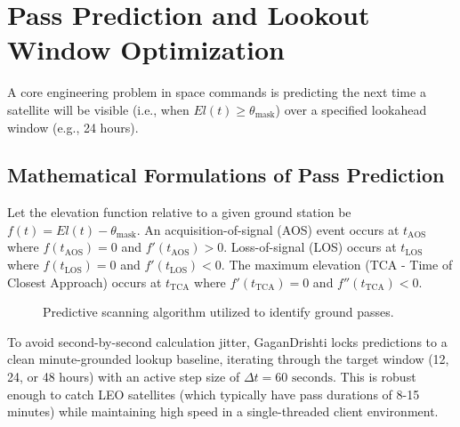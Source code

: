 \documentclass[11pt,journal,onecolumn]{IEEEtran}
\begin{document}
\section{Pass Prediction and Lookout Window Optimization}
A core engineering problem in space commands is predicting the next time a satellite will be visible (i.e., when $El(t) \ge \theta_{\text{mask}}$) over a specified lookahead window (e.g., 24 hours). 

\subsection{Mathematical Formulations of Pass Prediction}
Let the elevation function relative to a given ground station be $f(t) = El(t) - \theta_{\text{mask}}$. An acquisition-of-signal (AOS) event occurs at $t_{\text{AOS}}$ where $f(t_{\text{AOS}}) = 0$ and $f'(t_{\text{AOS}}) > 0$. Loss-of-signal (LOS) occurs at $t_{\text{LOS}}$ where $f(t_{\text{LOS}}) = 0$ and $f'(t_{\text{LOS}}) < 0$. The maximum elevation (TCA - Time of Closest Approach) occurs at $t_{\text{TCA}}$ where $f'(t_{\text{TCA}}) = 0$ and $f''(t_{\text{TCA}}) < 0$.

\begin{figure}[htbp]
\centering
{}
\caption{Predictive scanning algorithm utilized to identify ground passes.}
\label{fig:algorithm}
\end{figure}

To avoid second-by-second calculation jitter, GaganDrishti locks predictions to a clean minute-grounded lookup baseline, iterating through the target window (12, 24, or 48 hours) with an active step size of $\Delta t = 60\text{ seconds}$. This is robust enough to catch LEO satellites (which typically have pass durations of 8-15 minutes) while maintaining high speed in a single-threaded client environment.
\end{document}
